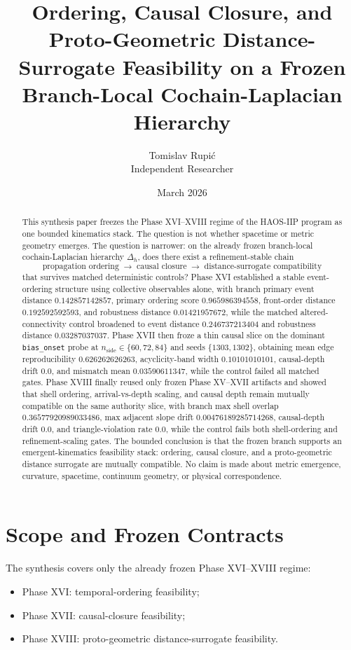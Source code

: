\documentclass[11pt]{article}
\title{Ordering, Causal Closure, and Proto-Geometric Distance-Surrogate Feasibility on a Frozen Branch-Local Cochain-Laplacian Hierarchy}
\author{Tomislav Rupi\'c \\ Independent Researcher}
\date{March 2026}
\begin{document}
\maketitle

\begin{abstract}
This synthesis paper freezes the Phase XVI--XVIII regime of the HAOS-IIP program as one bounded kinematics stack. The question is not whether spacetime or metric geometry emerges. The question is narrower: on the already frozen branch-local cochain-Laplacian hierarchy $\Delta_h$, does there exist a refinement-stable chain
\[
\text{propagation ordering}
\;\to\;
\text{causal closure}
\;\to\;
\text{distance-surrogate compatibility}
\]
that survives matched deterministic controls? Phase XVI established a stable event-ordering structure using collective observables alone, with branch primary event distance $0.142857142857$, primary ordering score $0.965986394558$, front-order distance $0.192592592593$, and robustness distance $0.01421957672$, while the matched altered-connectivity control broadened to event distance $0.246737213404$ and robustness distance $0.03287037037$. Phase XVII then froze a thin causal slice on the dominant \texttt{bias\_onset} probe at $n_{\mathrm{side}} \in \{60,72,84\}$ and seeds $\{1303,1302\}$, obtaining mean edge reproducibility $0.626262626263$, acyclicity-band width $0.10101010101$, causal-depth drift $0.0$, and mismatch mean $0.03590611347$, while the control failed all matched gates. Phase XVIII finally reused only frozen Phase XV--XVII artifacts and showed that shell ordering, arrival-vs-depth scaling, and causal depth remain mutually compatible on the same authority slice, with branch max shell overlap $0.36577920989033486$, max adjacent slope drift $0.00476189285714268$, causal-depth drift $0.0$, and triangle-violation rate $0.0$, while the control fails both shell-ordering and refinement-scaling gates. The bounded conclusion is that the frozen branch supports an emergent-kinematics feasibility stack: ordering, causal closure, and a proto-geometric distance surrogate are mutually compatible. No claim is made about metric emergence, curvature, spacetime, continuum geometry, or physical correspondence.
\end{abstract}

\section{Scope and Frozen Contracts}

The synthesis covers only the already frozen Phase XVI--XVIII regime:
\begin{itemize}
\item Phase XVI: temporal-ordering feasibility;
\item Phase XVII: causal-closure feasibility;
\item Phase XVIII: proto-geometric distance-surrogate feasibility.
\end{itemize}
\end{document}
